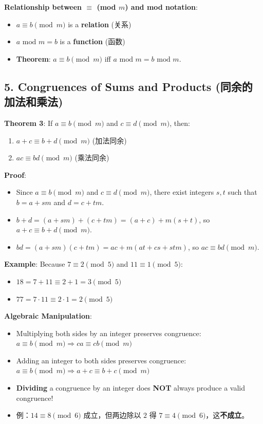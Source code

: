 \documentclass[10pt,a4paper,openany]{ctexbook}
\theoremstyle{definition}
\theoremstyle{remark}
\begin{document}
\textbf{Relationship between $\equiv$ (mod $m$) and mod notation}:
\begin{itemize}
\item $a \equiv b \pmod{m}$ is a \textbf{relation} (关系)
\item $a \text{ mod } m = b$ is a \textbf{function} (函数)
\item \textbf{Theorem}: $a \equiv b \pmod{m}$ iff $a \text{ mod } m = b \text{ mod } m$.

\end{itemize}

\vspace{-2pt}

\subsection{5. Congruences of Sums and Products (同余的加法和乘法)}

\textbf{Theorem 3}: If $a \equiv b \pmod{m}$ and $c \equiv d \pmod{m}$, then:
\begin{enumerate}
\item $a + c \equiv b + d \pmod{m}$ (加法同余)
\item $ac \equiv bd \pmod{m}$ (乘法同余)

\end{enumerate}

\textbf{Proof}:
\begin{itemize}
\item Since $a \equiv b \pmod{m}$ and $c \equiv d \pmod{m}$, there exist integers $s, t$ such that $b = a + sm$ and $d = c + tm$.
\item $b + d = (a + sm) + (c + tm) = (a + c) + m(s + t)$, so $a + c \equiv b + d \pmod{m}$.
\item $bd = (a + sm)(c + tm) = ac + m(at + cs + stm)$, so $ac \equiv bd \pmod{m}$.

\end{itemize}

\textbf{Example}: Because $7 \equiv 2 \pmod{5}$ and $11 \equiv 1 \pmod{5}$:
\begin{itemize}
\item $18 = 7 + 11 \equiv 2 + 1 = 3 \pmod{5}$
\item $77 = 7 \cdot 11 \equiv 2 \cdot 1 = 2 \pmod{5}$

\end{itemize}

\textbf{Algebraic Manipulation}:
\begin{itemize}
\item Multiplying both sides by an integer preserves congruence: $a \equiv b \pmod{m} \Rightarrow ca \equiv cb \pmod{m}$
\item Adding an integer to both sides preserves congruence: $a \equiv b \pmod{m} \Rightarrow a + c \equiv b + c \pmod{m}$
\item \textbf{Dividing} a congruence by an integer does \textbf{NOT} always produce a valid congruence!
\item 例：$14 \equiv 8 \pmod{6}$ 成立，但两边除以 $2$ 得 $7 \equiv 4 \pmod{6}$，这\textbf{不成立}。

\end{itemize}
\end{document}
